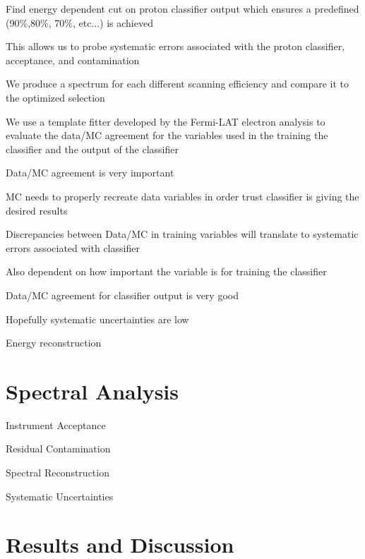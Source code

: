 \documentclass{article}
\begin{document}
\begin{myEnumerate}
\begin{myEnumerate}
\begin{myEnumerate}
\begin{myEnumerate}
						\item Find energy dependent cut on proton classifier output which ensures a predefined (90$\%$,80$\%$, 70$\%$, etc...) is achieved
						\item This allows us to probe systematic errors associated with the proton classifier, acceptance, and contamination
						\item We produce a spectrum for each different scanning efficiency and compare it to the optimized selection
					\end{myEnumerate}
					\item We use a template fitter developed by the Fermi-LAT electron analysis to evaluate the data/MC agreement for the variables used in the training the classifier and the output of the classifier
					\begin{myEnumerate}
						\item Data/MC agreement is very important
						\item MC needs to properly recreate data variables in order trust classifier is giving the desired results
						\item Discrepancies between Data/MC in training variables will translate to systematic errors associated with classifier
						\item Also dependent on how important the variable is for training the classifier
						\item Data/MC agreement for classifier output is very good
						\item Hopefully systematic uncertainties are low
					\end{myEnumerate}
				\end{myEnumerate}
			\end{myEnumerate}
		\item Energy reconstruction
			\begin{myEnumerate}
				\item 
			\end{myEnumerate}
	\end{myEnumerate}

\section{Spectral Analysis}
	\begin{myEnumerate}
		\item Instrument Acceptance
		\item Residual Contamination
		\item Spectral Reconstruction
		\item Systematic Uncertainties
	\end{myEnumerate}
\section{Results and Discussion}
\end{document}
